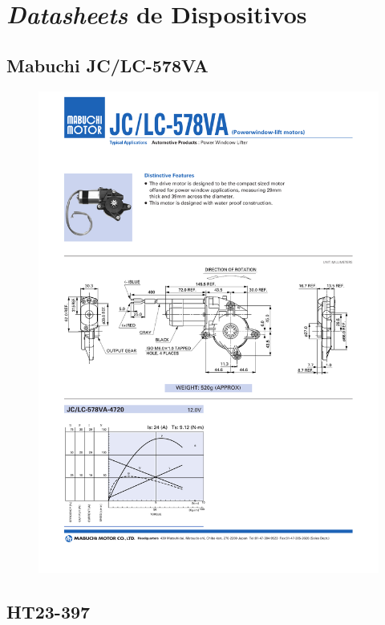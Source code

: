 \chapter{\textit{Datasheets} de Dispositivos}

\section{Mabuchi JC/LC-578VA}

\label{Mabuchi}

\begin{figure}[h]   
\begin{centering}
\includegraphics[width=0.8\columnwidth]{datasheets/mabuchi.pdf}
\par\end{centering}

\end{figure}

\newpage
\section{HT23-397}

\label{HT23}

